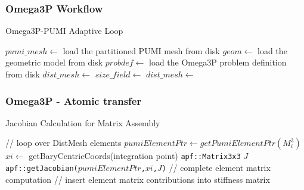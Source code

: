 \documentclass{beamer}
\begin{document}
\begin{frame}
  \frametitle{Omega3P Workflow}
  \begin{algorithm}[H]
    \caption{Omega3P-PUMI Adaptive Loop}\label{alg:omega3pAdaptLoop}
    \begin{algorithmic}[1]
        \State $pumi\_mesh \gets$ load the partitioned PUMI mesh from disk
        \State $geom \gets$ load the geometric model from disk
        \State $probdef \gets$ load the Omega3P problem definition from disk
        \State $dist\_mesh \gets$  
         
          \State {} 
          \State {}
          \State $size\_field \gets$ 
          \State {}
          \State {} 
          \State $dist\_mesh \gets$  
        \EndWhile
      \EndProcedure
    \end{algorithmic}
  \end{algorithm}
\end{frame}

\begin{frame}
  \frametitle{Omega3P - Atomic transfer}
  \begin{algorithm}[H]
    \caption{Jacobian Calculation for Matrix Assembly}
    \label{alg:omega3pJacobian}
    \begin{algorithmic}[1]
      \State // loop over DistMesh elements
      \State $pumiElementPtr \gets getPumiElementPtr(M^3_i)$
             \label{alg:o3p_pointer}
        \State $xi \leftarrow$ getBaryCentricCoords(integration point)
               \label{alg:o3p_bary}
        \State \texttt{apf::Matrix3x3} $J$
        \State \texttt{apf::getJacobian($pumiElementPtr$,$xi$,$J$)}
               \label{alg:o3p_getJ}
        \State // complete element matrix computation
      \EndFor
      \State // insert element matrix contributions into stiffness matrix
      \EndFor
    \end{algorithmic}
  \end{algorithm}
\end{frame}
\end{document}
